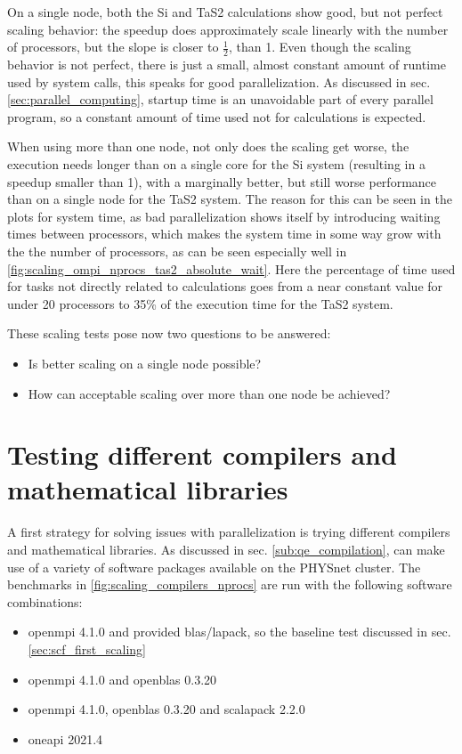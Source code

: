 \documentclass[main.tex]{subfiles}
\begin{document}
On a single node, both the Si and TaS2 calculations show good, but not perfect scaling behavior: the speedup does approximately scale linearly with the number of processors, but the slope is closer to \(\frac{1}{2}\), than 1.
Even though the scaling behavior is not perfect, there is just a small, almost constant amount of runtime used by system calls, this speaks for good parallelization.
As discussed in sec. \ref{sec:parallel_computing}, startup time is an unavoidable part of every parallel program, so a constant amount of time used not for calculations is expected.

When using more than one node, not only does the scaling get worse, the execution needs longer than on a single core for the Si system (resulting in a speedup smaller than 1), with a marginally better, but still worse performance than on a single node for the TaS2 system.
The reason for this can be seen in the plots for system time, as bad parallelization shows itself by introducing waiting times between processors, which makes the system time in some way grow with the the number of processors, as can be seen especially well in \ref{fig:scaling_ompi_nprocs_tas2_absolute_wait}.
Here the percentage of time used for tasks not directly related to calculations goes from a near constant value for under 20 processors to 35\% of the execution time for the TaS2 system.

These scaling tests pose now two questions to be answered:
\begin{itemize}
    \item Is better scaling on a single node possible?
    \item How can acceptable scaling over more than one node be achieved?
\end{itemize}

\section{Testing different compilers and mathematical libraries}

A first strategy for solving issues with parallelization is trying different compilers and mathematical libraries.
As discussed in sec. \ref{sub:qe_compilation}, \QE can make use of a variety of software packages available on the PHYSnet cluster.
The benchmarks in \ref{fig:scaling_compilers_nprocs} are run with the following software combinations:
\begin{itemize}
    \item \gls{openmpi} 4.1.0 and \QE provided \gls{blas}/\gls{lapack}, so the baseline test discussed in sec. \ref{sec:scf_first_scaling}
    \item \gls{openmpi} 4.1.0 and \gls{openblas} 0.3.20
    \item \gls{openmpi} 4.1.0, \gls{openblas} 0.3.20 and \gls{scalapack} 2.2.0
    \item \gls{oneapi} 2021.4
\end{itemize}
\end{document}
